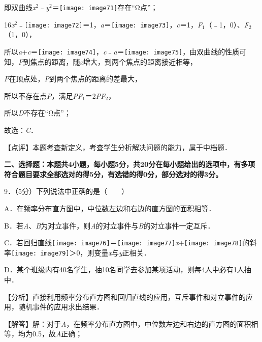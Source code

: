 \documentclass[a4paper,11pt,UTF8,twoside]{ctexart} %
\begin{document}
即双曲线\textit{x}${}^{2}$﹣\textit{y}${}^{2}$＝\texttt{[image: image71]}存在``$\mathrm{\Omega }$点''；

16\textit{x}${}^{2}$﹣\texttt{[image: image72]}＝1，\textit{a}＝\texttt{[image: image73]}，\textit{c}＝1，\textit{F}${}_{1}$（﹣1，0）、\textit{F}${}_{2}$（1，0），

所以\textit{a}+\textit{c}＝\texttt{[image: image74]}，\textit{c}﹣\textit{a}＝\texttt{[image: image75]}，由双曲线的性质可知，\textit{P}到焦点的距离，随{\textbar}\textit{x}{\textbar}增大，到两个焦点的距离接近相等，

\textit{P}在顶点处，\textit{P}到两个焦点的距离的差最大，

所以不存在点\textit{P}，满足{\textbar}\textit{PF}${}_{1}${\textbar}＝2{\textbar}\textit{PF}${}_{2}${\textbar}，

所以\textit{D}不存在``$\mathrm{\Omega }$点''；

故选：\textit{C}．

【点评】本题考查新定义，考查学生分析解决问题的能力，属于中档题．

\textbf{二、选择题：本题共4小题，每小题5分，共20分在每小题给出的选项中，有多项符合题目要求全部选对的得5分，有选错的得0分，部分选对的得3分。}

9．（5分）下列说法中正确的是（　　）

A．在频率分布直方图中，中位数左边和右边的直方图的面积相等． 

B．若\textit{A}、\textit{B}为对立事件，则\textit{A}的对立事件与\textit{B}的对立事件一定互斥． 

C．若回归直线\texttt{[image: image76]}＝\texttt{[image: image77]}\textit{x}+\texttt{[image: image78]}的斜率\texttt{[image: image79]}＞0，则变量\textit{x}与\textit{y}正相关． 

D．某个班级内有40名学生，抽10名同学去参加某项活动，则每4人中必有1人抽中．

【分析】直接利用频率分布直方图和回归直线的应用，互斥事件和对立事件的应用，随机事件的应用求出结果．

【解答】解：对于\textit{A}，在频率分布直方图中，中位数左边和右边的直方图的面积相等，均为0.5，故\textit{A}正确；
\end{document}
